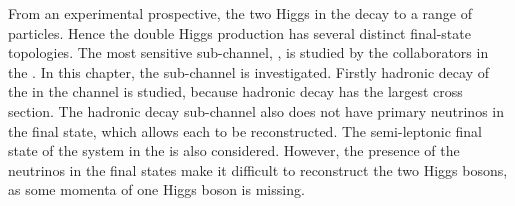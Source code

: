 


From an experimental prospective, the two Higgs in the  \eeToHH decay to a range of particles. Hence the double Higgs production has several distinct final-state topologies. The most sensitive sub-channel, \eeToHHbbbb, is studied by the collaborators in the \CERN. In this chapter, the \eeToHHbbWW sub-channel  is investigated. Firstly hadronic decay of the \WW in the \eeToHHbbWW channel is studied, because hadronic decay has the largest cross section. The hadronic decay sub-channel also does not have  primary neutrinos in the final state, which allows each \PW to be reconstructed. The semi-leptonic final state of the \WW system in the \eeToHHbbWW is also considered. However, the presence of the neutrinos in the final states make it  difficult to reconstruct the two Higgs bosons, as some momenta of one Higgs boson is missing. %




